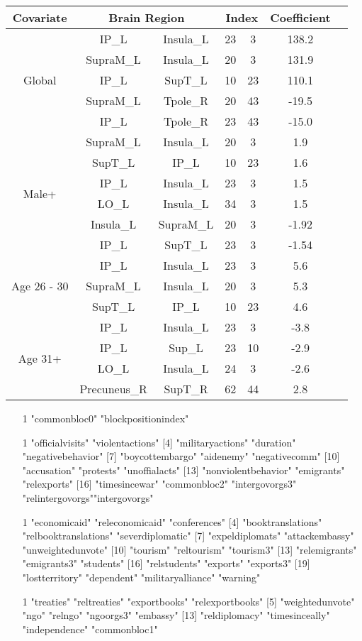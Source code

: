 \documentclass{article}
\begin{document}
\begin{tabular}{c|cc|cc|c|c|}
Covariate&\multicolumn{2}{c|}{Brain Region}& \multicolumn{2}{c|}{Index}& Coefficient\\
\hline
\multirow{5}{*}{Global}&IP\_L&Insula\_L& 23&3&138.2\\
&SupraM\_L&Insula\_L&20&   3&131.9\\
&IP\_L&SupT\_L&10& 23&110.1\\
&SupraM\_L&Tpole\_R&20&43& -19.5\\
&IP\_L&Tpole\_R&23&43&-15.0\\
\hline 
\multirow{6}{*}{Male+}&SupraM\_L&Insula\_L&20&3&1.9\\
&SupT\_L&IP\_L&10&23&1.6\\
&IP\_L& Insula\_L&23&3&1.5\\
&LO\_L& Insula\_L&34&3&1.5\\
&Insula\_L&SupraM\_L&20&3&-1.92\\
&IP\_L&SupT\_L&23&3&-1.54\\
\hline
\multirow{3}{*}{Age 26 - 30} &IP\_L&Insula\_L&23&3&5.6\\
&SupraM\_L&Insula\_L&20&3&5.3\\
&SupT\_L&IP\_L&10&23&4.6\\
\hline
\multirow{4}{*}{Age 31+} &IP\_L&Insula\_L&23&3&-3.8\\
&IP\_L&Sup\_L&23&10&-2.9\\
&LO\_L&Insula\_L&24&3&-2.6\\
&Precuneus\_R&SupT\_R&62&44& 2.8\\
\end{tabular}

\begin{enumerate}
\item 
[1] "commonbloc0"        "blockpositionindex"
\item 
 [1] "officialvisits"             "violentactions"    
 [4] "militaryactions"    "duration"           "negativebehavior"  
 [7] "boycottembargo"     "aidenemy"           "negativecomm"      
[10] "accusation"         "protests"           "unoffialacts"      
[13] "nonviolentbehavior" "emigrants"          "relexports"        
[16] "timesincewar"       "commonbloc2"         "intergovorgs3" "relintergovorgs""intergovorgs" 
\item 
 [1] "economicaid"         "releconomicaid"      "conferences"        
 [4] "booktranslations"    "relbooktranslations" "severdiplomatic"    
 [7] "expeldiplomats"      "attackembassy"       "unweightedunvote"   
[10] "tourism"             "reltourism"          "tourism3"           
[13] "relemigrants"        "emigrants3"          "students"           
[16] "relstudents"         "exports"             "exports3"           
[19] "lostterritory"       "dependent"           "militaryalliance"   "warning"    
\item 
 [1] "treaties"        "reltreaties"     "exportbooks"     "relexportbooks" 
 [5] "weightedunvote"    "ngo"            "relngo"          "ngoorgs3"        "embassy"        
[13] "reldiplomacy"    "timesinceally"   "independence"    "commonbloc1"   
\end{enumerate}
\end{document}
